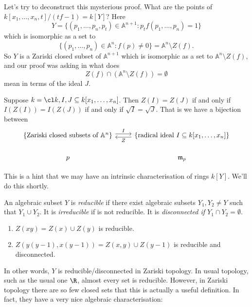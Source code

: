 \documentclass[a4paper]{article}
\renewcommand{\A}{\mathbb{A}}
\begin{document}
\begin{remark}
  Let's try to deconstruct this mysterious proof. What are the points of \(k[x_1, \dots, x_n, t]/(tf - 1) = k[Y]\)? Here
  \[
    Y = \{(p_1, \dots, p_n, p_t) \in \A^{n + 1}: p_t f(p_1, \dots, p_n) = 1\}
  \]
  which is isomorphic as a set to
  \[
    \{(p_1, \dots, p_n) \in \A^n: f(p) \neq 0\} = \A^n \setminus Z(f).
  \]
  So \(Y\) is a Zariski closed subset of \(\A^{n + 1}\) which is isomorphic as a set to \(\A^n \setminus Z(f)\), and our proof was asking in what does
  \[
    Z(f) \cap (\A^n \setminus Z(f)) = \emptyset
  \]
  mean in terms of the ideal \(J\).
\end{remark}

\begin{corollary}
  Suppose \(k = \cl k, I, J \subseteq k[x_1, \dots, x_n]\). Then \(Z(I) = Z(J)\) if and only if \(I(Z(I)) = I(Z(J))\) if and only if \(\sqrt I = \sqrt J\). That is we have a bijection between
  \[
    \begin{tikzcd}
      \{\text{Zariski closed subsets of } \A^n\} \ar[r, "I", shift left] & \{\text{radical ideal } I \subseteq k[x_1, \dots, x_n]\} \ar[l, "Z", shift left] \\
      p & \mathfrak m_p
    \end{tikzcd}
  \]
\end{corollary}

This is a hint that we may have an intrinsic characterisation of rings \(k[Y]\). We'll do this shortly.

\begin{definition}
  An algebraic subset \(Y\) is \emph{reducible} if there exist algebraic subsets \(Y_1, Y_2 \neq Y\) such that \(Y_1 \cup Y_2\). It is \emph{irreducible} if is not reducible. It is \emph{disconnected if \(Y_1 \cap Y_2 = \emptyset\)}.
\end{definition}

\begin{eg}\leavevmode
  \begin{enumerate}
  \item \(Z(xy) = Z(x) \cup Z(y)\) is reducible.
  \item \(Z(y(y - 1), x(y - 1)) = Z(x, y) \cup Z(y - 1)\) is reducible and disconnected.
  \end{enumerate}
\end{eg}

In other words, \(Y\) is reducible/disconnected in Zariski topology. In usual topology, such as the usual one \(\R\), almost every set is reducible. However, in Zariski topology there are so few closed sets that this is actually a useful definition. In fact, they have a very nice algebraic characterisation:
\end{document}
